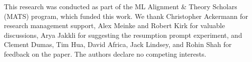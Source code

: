 \documentclass{article}
\begin{document}
%
%
%

\begin{ack}
This research was conducted as part of the ML Alignment \& Theory Scholars (MATS) program, which funded this work. We thank Christopher Ackermann for research management support, Alex Meinke and Robert Kirk for valuable discussions, Arya Jakkli for suggesting the resumption prompt experiment, and Clement Dumas, Tim Hua, David Africa, Jack Lindsey, and Rohin Shah for feedback on the paper. The authors declare no competing interests.
\end{ack}
\end{document}

